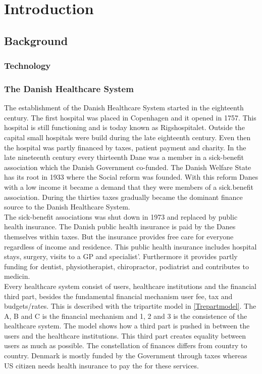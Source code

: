 \chapter{Introduction}

\section{Background}
\subsection{Technology}
\subsection{The Danish Healthcare System}



The establishment of the Danish Healthcare System started in the eighteenth century. The first hospital was placed in Copenhagen and it opened in 1757. This hospital is still functioning and is today known as Rigshospitalet. Outside the capital small hospitals were build during the late eighteenth century. Even then the hospital was partly financed by taxes, patient payment and charity. In the late nineteenth century every thirteenth Dane was a member in a sick-benefit association which the Danish Government co-funded. The Danish Welfare State has its root in 1933 where the Social reform was founded. With this reform Danes with a low income it became a demand that they were members of a sick.benefit association. During the thirties taxes gradually became the dominant finance source to the Danish Healthcare System.\\ 
The sick-benefit associations was shut down in 1973 and replaced by public health insurance. The Danish public health insurance is paid by the Danes themselves within taxes. But the insurance provides free care for everyone regardless of  income and residence. This public health insurance includes hospital stays, surgery, visits to a GP and specialist'. Furthermore it provides partly funding for dentist, physiotherapist, chiropractor, podiatrist and contributes to medicin.   \\
Every healthcare system consist of users, healthcare institutions and the financial third part, besides the fundamental financial mechanism user fee, tax and budgets/rates. This is described with the tripartite model in \cref{Trepartmodel}. The A, B and C is the financial mechanism and 1, 2 and 3 is the consistence of the healthcare system. The model shows how a third part is pushed in between the users and the healthcare institutions. This third part creates equality between users as much as possible. The constellation of finances differs from country to country. Denmark is mostly funded by the Government through taxes whereas US citizen needs health insurance to pay the for these services. \\
 


